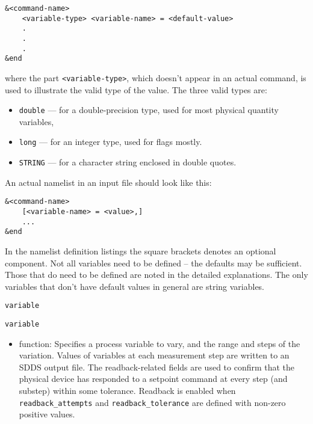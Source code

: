 \begin{itemize}
\begin{itemize}
\begin{verbatim}
&<command-name>
    <variable-type> <variable-name> = <default-value>
    .
    .
    .
&end
\end{verbatim}

where the part \verb+<variable-type>+, which doesn't appear in an
actual command, is used to illustrate the valid type of the value. The
three valid types are:
\begin{itemize}
   \item \verb+double+ --- for a double-precision type, used for most
   physical quantity variables,
   \item \verb+long+ ---   for an integer type, used for flags mostly.
   \item \verb+STRING+ --- for a character string enclosed in double quotes.
\end{itemize}
An actual namelist in an input file should look like this:
\begin{verbatim}
&<command-name>
    [<variable-name> = <value>,]
    ...
&end
\end{verbatim}

In the namelist definition listings the square brackets denotes an
optional component.  Not all variables need to be defined -- the
defaults may be sufficient.  Those that do need to be defined are
noted in the detailed explanations.  The only variables that don't
have default values in general are string variables.


\begin{latexonly}
\newpage\begin{center}{\Large \verb+variable+}\end{center}
\end{latexonly}
\begin{htmlonly}
\item {\Large \verb+variable+}
\end{htmlonly}

\begin{itemize}
   \item function: Specifies a process variable to vary, and the range
      and steps of the variation.  Values of variables at each
      measurement step are written to an SDDS output file.  The
      readback-related fields are used to confirm that the physical
      device has responded to a setpoint command at every step (and
      substep) within some tolerance. Readback is enabled when
      {\verb+readback_attempts+} and {\verb+readback_tolerance+} are
      defined with non-zero positive values.


\end{itemize}
\end{itemize}
\end{itemize}
